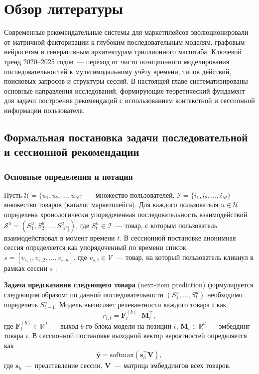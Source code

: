 \chapter{Обзор литературы}
\label{ch:chapter1}

Современные рекомендательные системы для маркетплейсов эволюционировали от матричной факторизации к глубоким последовательным моделям, графовым нейросетям и генеративным архитектурам триллионного масштаба. 
Ключевой тренд 2020–2025 годов~--- переход от чисто позиционного моделирования последовательностей к мультимодальному учёту времени, типов действий, поисковых запросов и структуры сессий.
В настоящей главе систематизированы основные направления исследований, формирующие теоретический фундамент для задачи построения рекомендаций с использованием контекстной и сессионной информации пользователя.

\section{Формальная постановка задачи последовательной и сессионной рекомендации}
\label{sec:ch1:problem}

\subsection{Основные определения и нотация}
\label{subsec:ch1:notation}

Пусть $\mathcal{U} = \{u_1, u_2, \ldots, u_N\}$~--- множество пользователей, $\mathcal{I} = \{i_1, i_2, \ldots, i_M\}$~--- множество товаров (каталог маркетплейса). Для каждого пользователя $u \in \mathcal{U}$ определена хронологически упорядоченная последовательность взаимодействий $\mathcal{S}^u = (S^u_1, S^u_2, \ldots, S^u_{|\mathcal{S}^u|})$, где $S^u_t \in \mathcal{I}$~--- товар, с которым пользователь взаимодействовал в момент времени $t$. 
В сессионной постановке анонимная сессия определяется как упорядоченный по времени список $s = [v_{s,1}, v_{s,2}, \ldots, v_{s,n}]$, где $v_{s,i} \in \mathcal{V}$~--- товар, на который пользователь кликнул в рамках сессии $s$ \cite{wu2019srgnn}.

\textbf{Задача предсказания следующего товара} (next-item prediction) формулируется следующим образом: по данной последовательности $(S^u_1, \ldots, S^u_t)$ необходимо определить $S^u_{t+1}$. 
Модель вычисляет релевантности каждого товара $i$ как
\begin{equation}
    r_{i,t} = \mathbf{F}_t^{(b)} \cdot \mathbf{M}_i^\top,
\end{equation}
где $\mathbf{F}_t^{(b)} \in \mathbb{R}^d$~--- выход $b$-го блока модели на позиции $t$, $\mathbf{M}_i \in \mathbb{R}^d$~--- эмбеддинг товара $i$. В сессионной постановке выходной вектор вероятностей определяется как
\begin{equation}
    \hat{\mathbf{y}} = \text{softmax}(\mathbf{s}_h^\top \mathbf{V}),
\end{equation}
где $\mathbf{s}_h$~--- представление сессии, $\mathbf{V}$~--- матрица эмбеддингов всех товаров.


